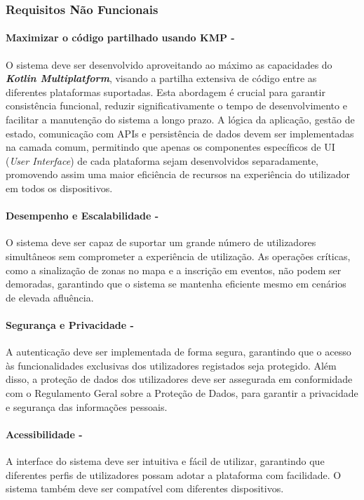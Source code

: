 \documentclass[a4paper,11pt]{article}
\begin{document}
\subsubsection{Requisitos Não Funcionais}

\paragraph{Maximizar o código partilhado usando KMP -}
O sistema deve ser desenvolvido aproveitando ao máximo as capacidades do \textit{\textbf{Kotlin Multiplatform}}, visando a partilha extensiva de código entre as diferentes plataformas suportadas. Esta abordagem é crucial para garantir consistência funcional, reduzir significativamente o tempo de desenvolvimento e facilitar a manutenção do sistema a longo prazo. A lógica da aplicação, gestão de estado, comunicação com APIs e persistência de dados devem ser implementadas na camada comum, permitindo que apenas os componentes específicos de UI (\textit{User Interface}) de cada plataforma sejam desenvolvidos separadamente, promovendo assim uma maior eficiência de recursos na experiência do utilizador em todos os dispositivos.

\paragraph{Desempenho e Escalabilidade -}
O sistema deve ser capaz de suportar um grande número de utilizadores simultâneos sem comprometer a experiência de utilização. As operações críticas, como a sinalização de zonas no mapa e a inscrição em eventos, não podem ser demoradas, garantindo que o sistema se mantenha eficiente mesmo em cenários de elevada afluência.

\paragraph{Segurança e Privacidade -}
A autenticação deve ser implementada de forma segura, garantindo que o acesso às funcionalidades exclusivas dos utilizadores registados seja protegido. Além disso, a proteção de dados dos utilizadores deve ser assegurada em conformidade com o Regulamento Geral sobre a Proteção de Dados, para garantir a privacidade e segurança das informações pessoais.

\paragraph{Acessibilidade -}
A interface do sistema deve ser intuitiva e fácil de utilizar, garantindo que diferentes perfis de utilizadores possam adotar a plataforma com facilidade. O sistema também deve ser compatível com diferentes dispositivos.
\end{document}
